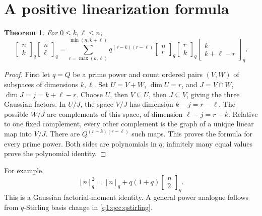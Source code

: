 \documentclass[11pt,a4paper,oneside,openany]{book}
\newtheorem{theorem}{Theorem}[chapter]
\theoremstyle{definition}
\theoremstyle{remark}
\newcommand{\GB}[3][q]{\begin{bmatrix}#2\\#3\end{bmatrix}_{#1}}
\newcommand{\qi}[2][q]{[#2]_{#1}}
\begin{document}
\section{A positive linearization formula}
\begin{theorem}\label{q1:qcc:linearization}
For \(0\le k,\ell\le n\),
\begin{equation}\label{q1:qcc:linearization-formula}
 \GB nk\GB n\ell
 =\sum_{r=\max(k,\ell)}^{\min(n,k+\ell)}
 q^{(r-k)(r-\ell)}\GB nr\GB rk\GB k{k+\ell-r}.
\end{equation}
\end{theorem}
\begin{proof}
First let \(q=Q\) be a prime power and count ordered pairs \((V,W)\) of
subspaces of dimensions \(k,\ell\). Set \(U=V+W\), \(\dim U=r\), and
\(J=V\cap W\), \(\dim J=j=k+\ell-r\). Choose \(U\), then \(V\subseteq U\),
then \(J\subseteq V\), giving the three Gaussian factors.
In \(U/J\), the space \(V/J\) has dimension \(k-j=r-\ell\).
The possible \(W/J\) are complements of this space, of dimension
\(\ell-j=r-k\). Relative to one fixed complement, every other complement is
the graph of a unique linear map into \(V/J\). There are
\(Q^{(r-k)(r-\ell)}\) such maps. This proves the formula for every prime power.
Both sides are polynomials in \(q\); infinitely many equal values prove the
polynomial identity.
\end{proof}
For example,
\begin{equation}\label{q1:qcc:qinteger-square}
 \qi n^2=\qi n+q(1+q)\GB n2.
\end{equation}
This is a Gaussian factorial-moment identity. A general power analogue follows
from \(q\)-Stirling basis change in \cref{q1:qcc:qstirling}.
\end{document}
